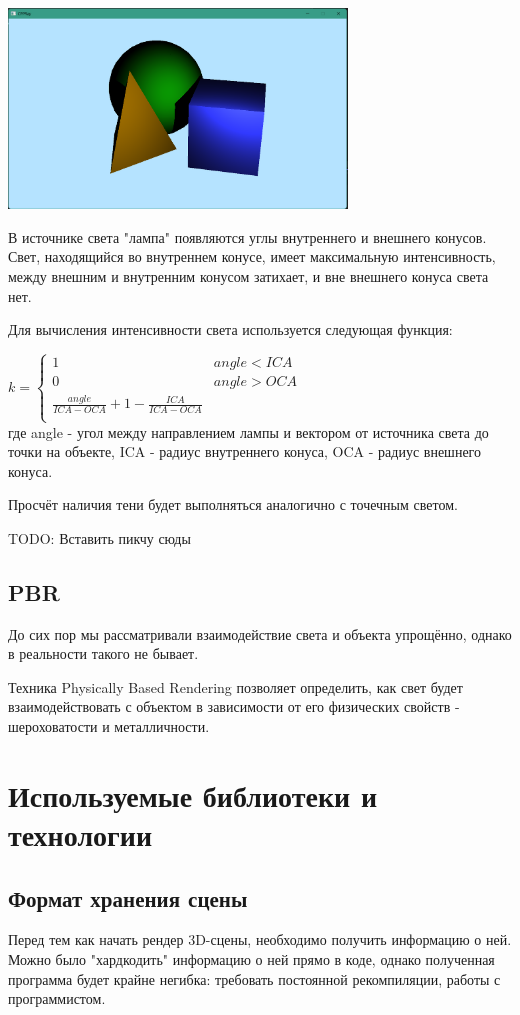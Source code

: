 \documentclass[a4paper,14pt]{extarticle}
\newcommand\makenewfig[3] {
    \captionsetup{format=imagecaption}
    \begin{center}
        #1
        \nopagebreak
        \captionof{figure}{#2}
        \nopagebreak
        \label{#3}
    \end{center}
}
\begin{document}
\makenewfig{\includegraphics[width=90mm]{raytrace_5}}{Точечный свет с тенью}{ris:raytrace_5}

В источнике света "лампа" появляются углы внутреннего и внешнего конусов. Свет, находящийся во внутреннем конусе, имеет максимальную интенсивность, 
между внешним и внутренним конусом затихает, и вне внешнего конуса света нет. 

Для вычисления интенсивности света используется следующая функция:

$k = \begin{cases}
    1 & angle < ICA\\
    0 & angle > OCA\\
    \frac{ angle } {ICA - OCA } + 1 -
				\frac{ICA}{ ICA - OCA} & \\
\end{cases}$\\
где angle - угол между направлением лампы и вектором от источника света до точки на объекте, 
ICA - радиус внутреннего конуса,
OCA - радиус внешнего конуса.

Просчёт наличия тени будет выполняться аналогично с точечным светом.

TODO: Вставить пикчу сюды

\subsection{PBR}

До сих пор мы рассматривали взаимодействие света и 
объекта упрощённо, однако в реальности такого не бывает.

Техника Physically Based Rendering позволяет определить,
как свет будет взаимодействовать с объектом в зависимости 
от его физических свойств - шероховатости и металличности.

\section{Используемые библиотеки и технологии}
\subsection{Формат хранения сцены}
Перед тем как начать рендер 3D-сцены, необходимо получить информацию о ней.
Можно было "хардкодить" информацию о ней прямо в коде, однако полученная программа 
будет крайне негибка: требовать постоянной рекомпиляции, работы с программистом.
\end{document}
